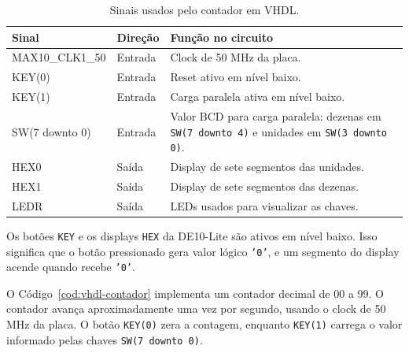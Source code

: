 \documentclass[12pt,a4paper]{article}
\begin{document}
\begin{table}[H]
\centering
\caption{Sinais usados pelo contador em VHDL.}
\label{tab:sinais}
\begin{tabular}{>{\ttfamily}p{}p{}p{}}
\toprule
\rowcolor{tablehead}
\color{white}\textbf{Sinal} & \color{white}\textbf{Direção} & \color{white}\textbf{Função no circuito} \\
\midrule
MAX10\_CLK1\_50 & Entrada & Clock de 50 MHz da placa. \\
KEY(0) & Entrada & Reset ativo em nível baixo. \\
KEY(1) & Entrada & Carga paralela ativa em nível baixo. \\
SW(7 downto 0) & Entrada & Valor BCD para carga paralela: dezenas em \texttt{SW(7 downto 4)} e unidades em \texttt{SW(3 downto 0)}. \\
HEX0 & Saída & Display de sete segmentos das unidades. \\
HEX1 & Saída & Display de sete segmentos das dezenas. \\
LEDR & Saída & LEDs usados para visualizar as chaves. \\
\bottomrule
\end{tabular}
\end{table}

Os botões \texttt{KEY} e os displays \texttt{HEX} da DE10-Lite são ativos em nível baixo. Isso significa que o botão pressionado gera valor lógico \texttt{'0'}, e um segmento do display acende quando recebe \texttt{'0'}.

O Código~\ref{cod:vhdl-contador} implementa um contador decimal de 00 a 99. O contador avança aproximadamente uma vez por segundo, usando o clock de 50 MHz da placa. O botão \texttt{KEY(0)} zera a contagem, enquanto \texttt{KEY(1)} carrega o valor informado pelas chaves \texttt{SW(7 downto 0)}.
\end{document}
